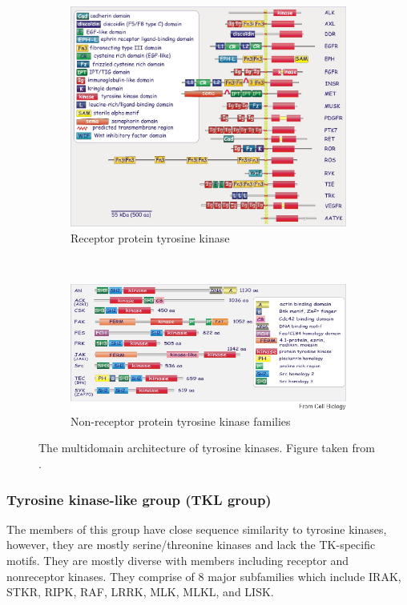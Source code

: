 \documentclass[a4paper, 11pt]{article}
\begin{document}
\begin{figure}[H]
\centering
	\begin{subfigure}{\textwidth}
	  \centering
	  \includegraphics[width=\linewidth]{figures/rtk.jpg}
	  \caption{Receptor protein tyrosine kinase}
	  \label{rtk}
	\end{subfigure}\\
	\begin{subfigure}{\textwidth}
	  \centering
	  \includegraphics[width=\linewidth]{figures/nrtk.jpg}
	  \caption{Non-receptor protein tyrosine kinase families}
	  \label{nrtk}
	\end{subfigure}
\caption{The multidomain architecture of tyrosine kinases. Figure taken from \cite{foreman2010textbook}. }
\label{tyrosine_kinase}
\end{figure}
\subsubsection*{Tyrosine kinase-like group (TKL group)}
The members of this group have close sequence similarity to tyrosine kinases, however, they are mostly serine/threonine kinases and lack the TK-specific motifs. They are mostly diverse with members including receptor and nonreceptor kinases. They comprise of 8 major subfamilies which include IRAK, STKR, RIPK, RAF, LRRK, MLK, MLKL, and LISK.\\
\end{document}
